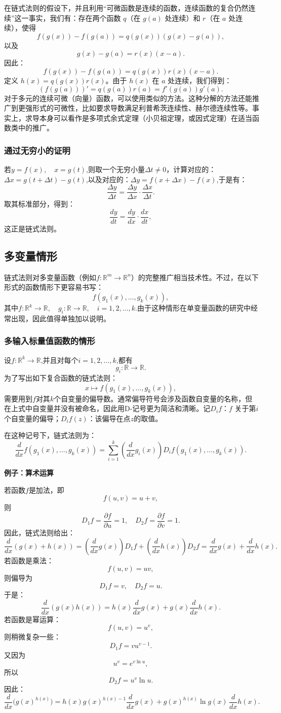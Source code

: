 在链式法则的假设下，并且利用“可微函数是连续的函数，连续函数的复合仍然连续”这一事实，我们有：存在两个函数 $q$（在 $g(a)$ 处连续）和 $r$（在 $a$ 处连续），使得
$$
f(g(x)) - f(g(a)) = q(g(x))(g(x) - g(a)),~
$$
以及
$$
g(x) - g(a) = r(x)(x-a).~
$$
因此：
$$
f(g(x)) - f(g(a)) = q(g(x))r(x)(x-a).~
$$
定义 $h(x) = q(g(x))r(x)$。由于 $h(x)$ 在 $a$ 处连续，我们得到：
$$
(f(g(a)))' = q(g(a))r(a) = f'(g(a))g'(a).~
$$
对于多元的连续可微（向量）函数，可以使用类似的方法。这种分解的方法还能推广到更强形式的可微性，比如要求导数满足利普希茨连续性、赫尔德连续性等。事实上，求导本身可以看作是多项式余式定理（小贝祖定理，或因式定理）在适当函数类中的推广。
\subsubsection{通过无穷小的证明}
若$y = f(x), \quad x = g(t)$,则取一个无穷小量$\Delta t \neq 0$，计算对应的：$\Delta x = g(t+\Delta t) - g(t)$,以及对应的：$\Delta y = f(x+\Delta x) - f(x)$,于是有：
$$
\frac{\Delta y}{\Delta t} = \frac{\Delta y}{\Delta x} \cdot \frac{\Delta x}{\Delta t}.~
$$
取其标准部分，得到：
$$
\frac{dy}{dt} = \frac{dy}{dx} \cdot \frac{dx}{dt},~
$$
这正是链式法则。
\subsection{多变量情形}
链式法则对多变量函数（例如$f: \mathbb{R}^m \to \mathbb{R}^n$）的完整推广相当技术性。不过，在以下形式的函数情形下更容易书写：
$$
f(g_{1}(x), \dots, g_{k}(x)),~
$$
其中$f: \mathbb{R}^k \to \mathbb{R},\quad g_i: \mathbb{R} \to \mathbb{R}, \quad i=1,2,\dots,k$.由于这种情形在单变量函数的研究中经常出现，因此值得单独加以说明。
\subsubsection{多输入标量值函数的情形}
设$f: \mathbb{R}^k \to \mathbb{R}$,并且对每个$i = 1, 2, \dots, k$,都有
$$
g_i: \mathbb{R} \to \mathbb{R}.~
$$
为了写出如下复合函数的链式法则：
$$
x \mapsto f(g_1(x), \dots, g_k(x)),~
$$
需要用到$f$对其$k$个自变量的偏导数。通常偏导符号会涉及函数自变量的名称，但在上式中自变量并没有被命名，因此用D-记号更为简洁和清晰。记$D_i f$：$f$ 关于第$i$个自变量的偏导；$D_i f(z)$：该偏导在点$z$的取值。

在这种记号下，链式法则为：
$$
\frac{d}{dx} f(g_1(x), \dots, g_k(x)) 
= \sum_{i=1}^k \left( \frac{d}{dx} g_i(x) \right) D_i f(g_1(x), \dots, g_k(x)).~
$$

\textbf{例子：算术运算}

若函数$f$是加法，即
$$
f(u,v) = u+v,~
$$
则
$$
D_{1}f = \frac{\partial f}{\partial u} = 1, 
\quad D_{2}f = \frac{\partial f}{\partial v} = 1.~
$$
因此，链式法则给出：
$$
\frac{d}{dx}(g(x)+h(x)) 
= \left(\frac{d}{dx} g(x)\right)D_{1}f 
+ \left(\frac{d}{dx} h(x)\right)D_{2}f 
= \frac{d}{dx} g(x) + \frac{d}{dx} h(x).~
$$
若函数是乘法：
$$
f(u,v) = uv,~
$$
则偏导为
$$
D_{1}f = v, 
\quad D_{2}f = u.~
$$
于是：
$$
\frac{d}{dx}(g(x)h(x)) 
= h(x)\frac{d}{dx}g(x) + g(x)\frac{d}{dx}h(x).~
$$
若函数是幂运算：
$$
f(u,v) = u^v,~
$$
则稍微复杂一些：
$$
D_{1}f = vu^{v-1}.~
$$
又因为
$$
u^v = e^{v\ln u},~
$$
所以
$$
D_{2}f = u^v \ln u.~
$$
因此：
$$
\frac{d}{dx}\bigl(g(x)^{h(x)}\bigr) 
= h(x) g(x)^{h(x)-1} \frac{d}{dx} g(x) 
+ g(x)^{h(x)} \ln g(x)\, \frac{d}{dx} h(x).~
$$
